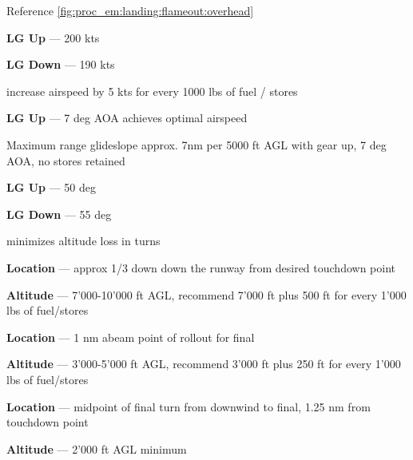 \begin{tcoloritemize}
    Reference \cref{fig:proc_em:landing:flameout:overhead}

    \textbf{LG Up} --- 200 kts
    
    \medskip
    \textbf{LG Down} --- 190 kts
    
    \bigskip
    increase airspeed by 5 kts for every 1000 lbs of fuel / stores

    \textbf{LG Up} --- 7 deg AOA achieves optimal airspeed

    \blueitem[Glideslope] Maximum range glideslope
    approx. 7nm per 5000 ft AGL with gear up,
    7 deg AOA, no stores retained

    \textbf{LG Up} --- 50 deg

    \medskip
    \textbf{LG Down} --- 55 deg

    \bigskip
    minimizes altitude loss in turns

    \textbf{Location} --- approx {1/3 down down the runway} from desired touchdown point

    \bigskip
    \textbf{Altitude} --- {7'000-10'000 ft AGL},
    recommend 7'000 ft plus 500 ft for every 1'000 lbs of fuel/stores

    \textbf{Location} --- {1 nm abeam} point of rollout for final 

    \bigskip
    \textbf{Altitude} --- {3'000-5'000 ft AGL},
    recommend 3'000 ft plus 250 ft for every 1'000 lbs of fuel/stores

    \textbf{Location} --- midpoint of final turn from downwind to final,
    {1.25 nm from touchdown point}

    \bigskip
    \textbf{Altitude} --- {2'000 ft AGL minimum}
\end{tcoloritemize}

